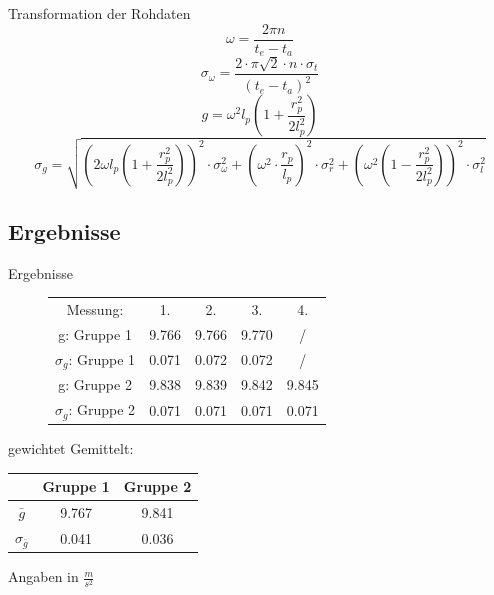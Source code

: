 \documentclass[11pt]{beamer}
\begin{document}
\begin{frame}{Transformation der Rohdaten}
\begin{equation*}
\omega=\frac{2\pi n}{t_e-t_a}
\end{equation*}
\begin{equation*}
\sigma_{\omega}=\frac{2\cdot \pi \sqrt{2}\cdot n \cdot \sigma_t}{(t_e-t_a)^2}
\end{equation*}
\begin{equation*}
g=\omega^2 l_p (1+\frac{r_p^2}{2 l_p^2}) 
\end{equation*}
\begin{equation*}
\sigma_g=\sqrt{(2\omega l_p (1+\frac{r_p^2}{2 l_p^2}))^2 \cdot \sigma_{\omega}^2+(\omega^2 \cdot \frac{r_p}{l_p})^2 \cdot \sigma_r^2+(\omega^2(1-\frac{r_p^2}{2 l_p^2}))^2 \cdot \sigma_l^2} 
\end{equation*}
\end{frame}

\subsection{Ergebnisse}
\begin{frame}{Ergebnisse}
\begin{figure}[H]\centering
\begin{tabular}{c|c|c|c|c}
Messung: & 1. & 2. & 3. & 4. \\ 
g: Gruppe 1 & 9.766 & 9.766 & 9.770 & / \\ 
$\sigma_g$: Gruppe 1 & 0.071 & 0.072 & 0.072 & / \\ 
g: Gruppe 2 & 9.838 & 9.839 & 9.842 & 9.845 \\ 
$\sigma_g$: Gruppe 2 & 0.071 & 0.071 & 0.071 & 0.071 \\ 
\end{tabular} 
\newline
\newline
\end{figure}
gewichtet Gemittelt:
\begin{center}
\begin{tabular}{c|c|c}
 & Gruppe 1 & Gruppe 2 \\ 
\hline 
$\bar{g}$ & 9.767 & 9.841 \\ 
$\sigma_{\bar{g}}$ & 0.041 & 0.036 \\ 
\end{tabular} 
\newline
\newline
Angaben in $\frac{m}{s^2}$
\end{center}
\end{frame}
\end{document}
